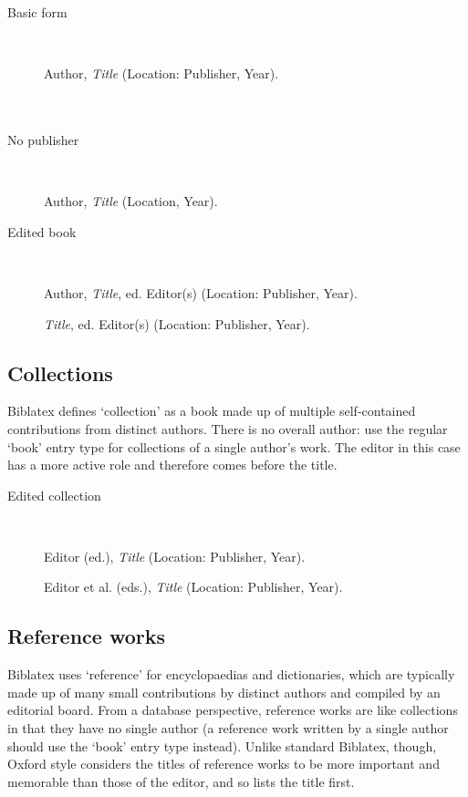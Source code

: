 \documentclass[extrafontsizes,11pt,a4paper,oneside]{memoir}
\newcommand*{\lit}[1]{\textsf{#1}}
\newcommand*{\code}[1]{`\textsf{#1}'}
\begin{document}
\begin{description}
  \item[Basic form]~\par
  Author, \emph{Title} (Location: Publisher, Year).
  \\
  \\
  \\
  
  \item[No publisher]~\par
  Author, \emph{Title} (Location, Year).
  \\
  
  \item[Edited book]~\par
  Author, \emph{Title}, \lit{ed.} Editor(s) (Location: Publisher, Year). \\\par
  \emph{Title}, \lit{ed.} Editor(s) (Location: Publisher, Year).
  \\
\end{description}

\subsection{Collections}

Biblatex defines \code{collection} as a book made up of multiple self-contained contributions from distinct authors. There is no overall author: use the regular \code{book} entry type for collections of a single author’s work. The editor in this case has a more active role and therefore comes before the title.

\begin{description}
  \item[Edited collection]~\par
  Editor (\lit{ed.}), \emph{Title} (Location: Publisher, Year).\par
  Editor \lit{et al.} (\lit{eds.}), \emph{Title} (Location: Publisher, Year).
  \\
\end{description}

\subsection{Reference works}

Biblatex uses \code{reference} for encyclopaedias and dictionaries, which are typically made up of many small contributions by distinct authors and compiled by an editorial board. From a database perspective, reference works are like collections in that they have no single author (a reference work written by a single author should use the \code{book} entry type instead). Unlike standard Biblatex, though, Oxford style considers the titles of reference works to be more important and memorable than those of the editor, and so lists the title first.
\end{document}
